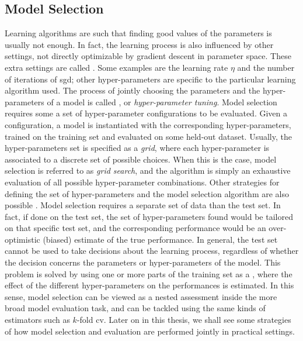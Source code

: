 \subsection{Model Selection}
Learning algorithms are such that finding good values of the parameters is usually not enough. In fact, the learning process is also influenced by other settings, not directly optimizable by gradient descent in parameter space. These extra settings are called . Some examples are the learning rate $\eta$ and the number of iterations of \gls{sgd}; other hyper-parameters are specific to the particular learning algorithm used. The process of jointly choosing the parameters and the hyper-parameters of a model is called , or \emph{hyper-parameter tuning}. Model selection requires some a set of hyper-parameter configurations to be evaluated. Given a configuration, a model is instantiated with the corresponding hyper-parameters, trained on the training set and evaluated on some held-out dataset. Usually, the hyper-parameters set is specified as a \emph{grid}, where each hyper-parameter is associated to a discrete set of possible choices. When this is the case, model selection is referred to as \emph{grid search}, and the algorithm is simply an exhaustive evaluation of all possible hyper-parameter combinations. Other strategies for defining the set of hyper-parameters and the model selection algorithm are also possible \cite{?}. Model selection requires a separate set of data than the test set. In fact, if done on the test set, the set of hyper-parameters found would be tailored on that specific test set, and the corresponding performance would be an over-optimistic (biased) estimate of the true performance. In general, the test set cannot be used to take decisions about the learning process, regardless of whether the decision concerns the parameters or hyper-parameters of the model. This problem is solved by using one or more parts of the training set as a , where the effect of the different hyper-parameters on the performances is estimated. In this sense, model selection can be viewed as a nested assessment inside the more broad model evaluation task, and can be tackled using the same kinds of estimators such as $k$-fold \gls{cv}. Later on in this thesis, we shall see some strategies of how model selection and evaluation are performed jointly in practical settings.

